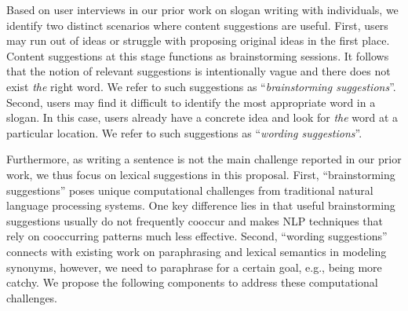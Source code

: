 Based on user interviews in our prior work on slogan writing with individuals, we identify two distinct scenarios where content suggestions are useful.
First, users may run out of ideas or struggle with proposing original ideas in the first place.
Content suggestions at this stage functions as brainstorming sessions.
It follows that the notion of relevant suggestions is intentionally vague and there does not exist {\em the} right word.
We refer to such suggestions as ``{\em brainstorming suggestions}''.
Second, users may find it difficult to identify the most appropriate word in a slogan.
In this case, users already have a concrete idea and look for {\em the} word at a particular location.
We refer to such suggestions as ``{\em wording suggestions}''.

Furthermore, as writing a sentence is not the main challenge reported in our prior work, we thus focus on lexical suggestions in this proposal.
First, ``brainstorming suggestions'' poses unique computational challenges from traditional natural language processing systems.
One key difference lies in that useful brainstorming suggestions usually do not frequently cooccur and makes NLP techniques that rely on cooccurring patterns much less effective.
Second, ``wording suggestions'' connects with existing work on paraphrasing and lexical semantics in modeling synonyms, however, we need to paraphrase for a certain goal, e.g., being more catchy.
We propose the following 
components to address these computational challenges.

